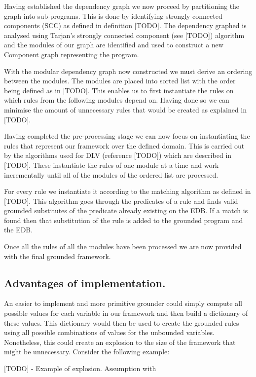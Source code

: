 Having established the dependency graph we now proceed by partitioning the graph into sub-programs. This is done by identifying strongly connected components (SCC) as defined in definition [TODO].	The dependency graphed is analysed using Tarjan's strongly connected component (see [TODO]) algorithm and the modules of our graph are identified and used to construct a new Component graph representing the program.

With the modular dependency graph now constructed we must derive an ordering between the modules. The modules are placed into sorted list with the order being defined as in  [TODO]. This enables us to first instantiate the rules on which rules from the following modules depend on. Having done so we can minimise the amount of unnecessary rules that would be created as explained in [TODO].

Having completed the pre-processing stage we can now focus on instantiating the rules that represent our framework over the defined domain. This is carried out by the algorithms used for DLV (reference [TODO]) which are described in [TODO]. These instantiate the rules of one module at a time and work incrementally until all of the modules of the ordered list are processed. 

For every rule we instantiate it according to the matching algorithm as defined in [TODO]. This algorithm goes through the predicates of a rule and finds valid grounded substitutes of the predicate already existing on the EDB. If a match is found then that substitution of the rule is added to the grounded program and the EDB.

Once all the rules of all the modules have been processed we are now provided with the final grounded framework.

\subsection{Advantages of implementation.}

An easier to implement and more primitive grounder could simply compute all possible values for each variable in our framework and then build a dictionary of these values. This dictionary would then be used to create the grounded rules using all possible combinations of values for the unbounded variables. Nonetheless, this could create an explosion to the size of the framework that might be unnecessary. Consider the following example:

[TODO] - Example of explosion. Assumption with 


